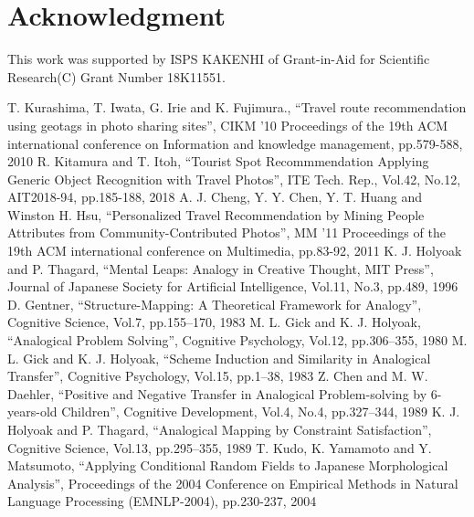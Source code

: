 \documentclass[journal]{IAENGtran}
\begin{document}
\section*{Acknowledgment}
This work was supported by ISPS KAKENHI of Grant-in-Aid for Scientific Research(C) Grant Number 18K11551.


\ifCLASSOPTIONcaptionsoff
  \newpage
\fi

\begin{thebibliography}{1}
    T. Kurashima, T. Iwata, G. Irie and K. Fujimura.,
      ``Travel route recommendation using geotags in photo sharing sites'',
      CIKM '10 Proceedings of the 19th ACM international conference on Information and knowledge management, pp.579-588, 2010
    R. Kitamura and T. Itoh,
      ``Tourist Spot Recommmendation Applying Generic Object Recognition with Travel Photos'',
      ITE Tech. Rep., Vol.42, No.12, AIT2018-94, pp.185-188, 2018
    A. J. Cheng, Y. Y. Chen, Y. T. Huang and Winston H. Hsu,
      ``Personalized Travel Recommendation by Mining People Attributes from Community-Contributed Photos'',
      MM '11 Proceedings of the 19th ACM international conference on Multimedia, pp.83-92, 2011
    K. J. Holyoak and P. Thagard,
      ``Mental Leaps: Analogy in Creative Thought, MIT Press'',
      Journal of Japanese Society for Artificial Intelligence,  Vol.11, No.3,  pp.489, 1996
    D. Gentner,
      ``Structure-Mapping: A Theoretical Framework for Analogy'',
      Cognitive Science, Vol.7, pp.155–170, 1983
    M. L. Gick and K. J. Holyoak,
      ``Analogical Problem Solving'',
      Cognitive Psychology, Vol.12, pp.306–355, 1980
    M. L. Gick and K. J. Holyoak,
      ``Scheme Induction and Similarity in Analogical Transfer'',
      Cognitive Psychology, Vol.15, pp.1–38, 1983
    Z. Chen and M. W. Daehler,
      ``Positive and Negative Transfer in Analogical Problem-solving by 6-years-old Children'',
      Cognitive Development, Vol.4, No.4, pp.327–344, 1989
    K. J. Holyoak and P. Thagard,
      ``Analogical Mapping by Constraint Satisfaction'',
      Cognitive Science, Vol.13, pp.295–355, 1989
    T. Kudo, K. Yamamoto and Y. Matsumoto,
    ``Applying Conditional Random Fields to Japanese Morphological Analysis'',
    Proceedings of the 2004 Conference on Empirical Methods in Natural Language Processing (EMNLP-2004), pp.230-237, 2004

\end{thebibliography}
\end{document}
